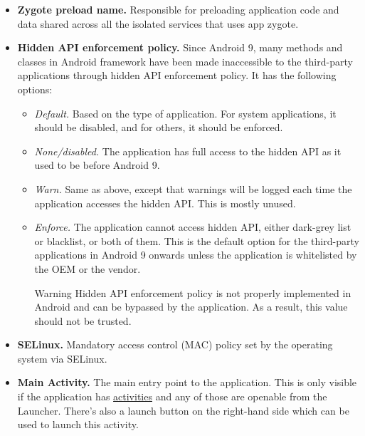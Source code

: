 \begin{itemize}
\begin{itemize}
        \item \textbf{Zygote preload name.} Responsible for preloading application code and data shared across all the
        isolated services that uses app zygote.

        \item \textbf{Hidden API enforcement policy.} Since Android 9, many methods and classes in Android framework
        have been made inaccessible to the third-party applications through hidden API enforcement policy. It has the
        following options:
        \begin{itemize}
            \item \textit{Default.} Based on the type of application. For system applications, it should be disabled,
            and for others, it should be enforced.
            \item \textit{None/disabled.} The application has full access to the hidden API as it used to be before
            Android 9.
            \item \textit{Warn.} Same as above, except that warnings will be logged each time the application accesses
            the hidden API. This is mostly unused.
            \item \textit{Enforce.} The application cannot access hidden API, either dark-grey list or blacklist, or
            both of them. This is the default option for the third-party applications in Android 9 onwards unless the
            application is whitelisted by the OEM or the vendor.
            \begin{warning}{Warning}
                Hidden API enforcement policy is not properly implemented in Android and can be bypassed by the
                application. As a result, this value should not be trusted.
            \end{warning}
        \end{itemize}

        \item \textbf{SELinux.} Mandatory access control (MAC) policy set by the operating system via SELinux.

        \item \textbf{Main Activity.} The main entry point to the application. This is only visible if the application has
        \hyperref[subsubsec:activities]{activities} and any of those are openable from the Launcher. There's also a
        launch button on the right-hand side which can be used to launch this activity.
    \end{itemize}
\end{itemize}

